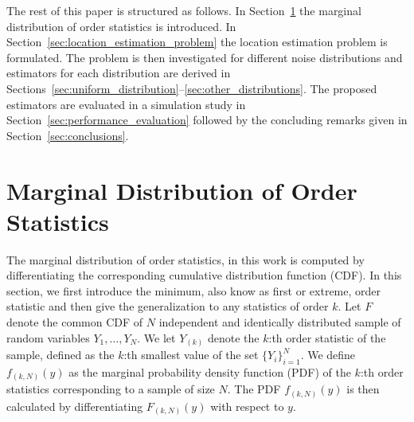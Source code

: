 \documentclass[journal]{IEEEtran}
\begin{document}
The rest of this paper is structured  as follows. In Section~\ref{sec:marginal_distribution_of_order_statistics} the marginal distribution of order statistics is introduced. In Section~\ref{sec:location_estimation_problem} the location estimation problem is formulated. The problem is then investigated for different noise distributions and estimators for each distribution are derived in Sections~\ref{sec:uniform_distribution}--\ref{sec:other_distributions}. The proposed estimators are evaluated in a simulation study in Section~\ref{sec:performance_evaluation} followed by the concluding remarks given in Section~\ref{sec:conclusions}.

\section{Marginal Distribution of Order Statistics}\label{sec:marginal_distribution_of_order_statistics}
The marginal distribution of order statistics, in this work is computed by differentiating the corresponding cumulative distribution function (CDF). In this section, we first introduce the minimum, also know as first or extreme, order statistic and then give the generalization to any statistics of order $k$. Let $F$ denote the common CDF of $N$ independent and identically distributed sample of random variables $Y_1,\ldots,Y_N$. We let $Y_{(k)}$ denote the $k$:th order statistic of the sample, defined as the $k$:th smallest value of the set $\{Y_i\}_{i=1}^N$. We define $f_{(k,N)}(y)$ as the marginal probability density function (PDF) of the $k$:th order statistics corresponding to a sample of size $N$. The PDF $f_{(k,N)}(y)$ is then calculated by differentiating $F_{(k,N)}(y)$ with respect to $y$.

\end{document}
